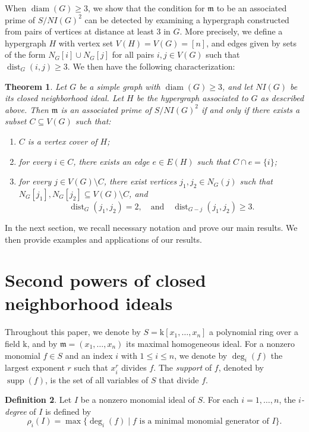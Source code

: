 \documentclass[12pt,reqno,twoside]{amsart}
\newcommand{\mm}{\mathfrak m}
\newcommand{\kk}{\mathrm k}
\DeclareMathOperator{\diam}{diam}
\DeclareMathOperator{\dist}{dist}
\DeclareMathOperator{\supp}{supp}
\newtheorem{thm}{\bf Theorem}[section]
\theoremstyle{definition}
\newtheorem{defn}[thm]{\bf Definition}
\theoremstyle{plain}
\theoremstyle{remark}
\numberwithin{equation}{section}
\begin{document}
When $\diam(G) \geq 3$, we show that the condition for $\mm$ to be an associated prime of $S/NI(G)^2$ can be detected by examining a hypergraph constructed from pairs of vertices at distance at least $3$ in $G$. More precisely, we define a hypergraph $H$ with vertex set $V(H) = V(G) = [n]$, and edges given by sets of the form $N_G[i] \cup N_G[j]$ for all pairs $i, j \in V(G)$ such that $\dist_G(i, j) \geq 3$. We then have the following characterization:

\begin{thm}\label{thm_diam_3}
Let $G$ be a simple graph with $\diam(G) \geq 3$, and let $NI(G)$ be its closed neighborhood ideal. Let $H$ be the hypergraph associated to $G$ as described above. Then $\mm$ is an associated prime of $S/NI(G)^2$ if and only if there exists a subset $C \subseteq V(G)$ such that:
\begin{enumerate}
    \item $C$ is a vertex cover of $H$;
    \item for every $i \in C$, there exists an edge $e \in E(H)$ such that $C \cap e = \{i\}$;
    \item for every $j \in V(G) \setminus C$, there exist vertices $j_1, j_2 \in N_G(j)$ such that $N_G[j_1], N_G[j_2] \subseteq V(G) \setminus C$, and 
    \[
    \dist_G(j_1, j_2) = 2, \quad \text{and} \quad \dist_{G - j}(j_1, j_2) \geq 3.
    \]
\end{enumerate}
\end{thm}

In the next section, we recall necessary notation and prove our main results. We then provide examples and applications of our results.

\section{Second powers of closed neighborhood ideals}
Throughout this paper, we denote by $S = \kk[x_1, \ldots, x_n]$ a polynomial ring over a field $\kk$, and by $\mm = (x_1, \ldots, x_n)$ its maximal homogeneous ideal. For a nonzero monomial $f \in S$ and an index $i$ with $1 \leq i \leq n$, we denote by $\deg_i(f)$ the largest exponent $r$ such that $x_i^r$ divides $f$. The \emph{support} of $f$, denoted by $\supp(f)$, is the set of all variables of $S$ that divide $f$.

\begin{defn}
Let $I$ be a nonzero monomial ideal of $S$. For each $i = 1, \ldots, n$, the \emph{$i$-degree} of $I$ is defined by
\[
\rho_i(I) = \max \{ \deg_i(f) \mid f \text{ is a minimal monomial generator of } I \}.
\]
\end{defn}
\end{document}
